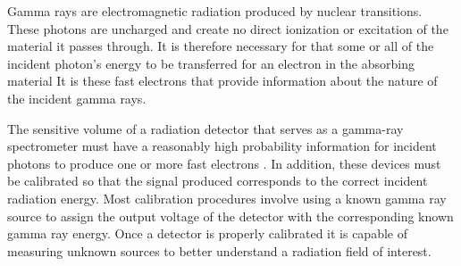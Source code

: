 
Gamma rays are electromagnetic radiation produced
by nuclear transitions. These photons are uncharged and create
no direct ionization or excitation of the material it passes through.
It is therefore necessary for that some or all of the incident
photon's energy to be transferred for an electron in the absorbing
material It is these fast electrons that provide information about
the nature of the incident gamma rays.


The sensitive volume of a radiation detector that serves as a
gamma-ray spectrometer must have a reasonably high probability information
for incident photons to produce one or more fast electrons \cite{knoll}.
In addition, these devices must be calibrated so that the signal produced
corresponds to the correct incident radiation energy. Most calibration
procedures involve using a known gamma ray source to assign the output
voltage of the detector with the corresponding known gamma ray energy. Once
a detector is properly calibrated it is capable of measuring unknown sources
to better understand a radiation field of interest.

